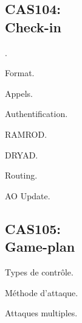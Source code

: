 \newpage


\begin{onepage}
	
	\section{CAS104:\\Check-in}
	
	\begin{e1}
		
		\item {}.
		
		\item Format.
		
		\item Appels.
		
		\item Authentification.
		
		\begin{e2}
			
			\item RAMROD.
			
			\item DRYAD.
			
		\end{e2}
		
		\item Routing.
		
		\item AO Update.
		
	\end{e1}
\end{onepage}

\newpage


\begin{onepage}
	
	\section{CAS105:\\Game-plan}
	
	\begin{e1}
		
		\item Types de contrôle.
		
		\item Méthode d'attaque.
		
		\item Attaques multiples.
		
	\end{e1}
\end{onepage}

